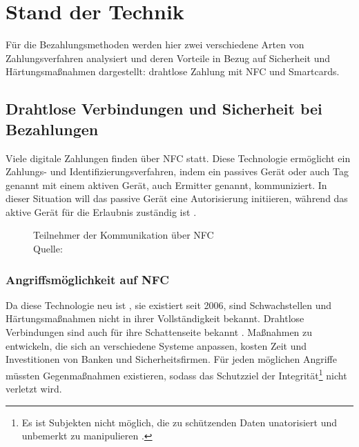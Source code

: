 \section{Stand der Technik}

Für die Bezahlungsmethoden werden hier zwei verschiedene Arten von Zahlungsverfahren analysiert und deren
Vorteile in Bezug auf Sicherheit und Härtungsmaßnahmen dargestellt: drahtlose Zahlung mit NFC und 
Smartcards.

\subsection{Drahtlose Verbindungen und Sicherheit bei Bezahlungen}

Viele digitale Zahlungen finden über NFC statt. Diese Technologie ermöglicht ein Zahlungs- und
Identifizierungsverfahren, indem ein passives Gerät oder auch Tag genannt mit einem aktiven Gerät,
auch Ermitter genannt, kommuniziert. In dieser Situation will das passive Gerät eine Autorisierung initiieren,
während das aktive Gerät für die Erlaubnis zuständig ist \cite{refart:NFNK}. 

\begin{figure}[H]
   \caption{Teilnehmer der Kommunikation über NFC\\Quelle: \cite{refart:GPIN}}
   \label{fig:refart_GPIN}
\end{figure}

\subsubsection{Angriffsmöglichkeit auf NFC}

Da diese Technologie neu ist \cite{refip:NTAS}, sie existiert seit 2006, sind Schwachstellen 
und Härtungsmaßnahmen nicht in ihrer Vollständigkeit bekannt. Drahtlose Verbindungen sind auch für ihre 
Schattenseite bekannt \cite{refip:NYRS}. Maßnahmen zu entwickeln, die sich an verschiedene Systeme anpassen,
kosten Zeit und Investitionen von Banken und Sicherheitsfirmen. Für jeden möglichen Angriffe müssten 
Gegenmaßnahmen existieren, sodass das Schutzziel der Integrität\footnote{Es ist Subjekten nicht möglich, 
die zu schützenden Daten unatorisiert und unbemerkt zu manipulieren \cite{refbook:SWIS}.} nicht verletzt wird.

